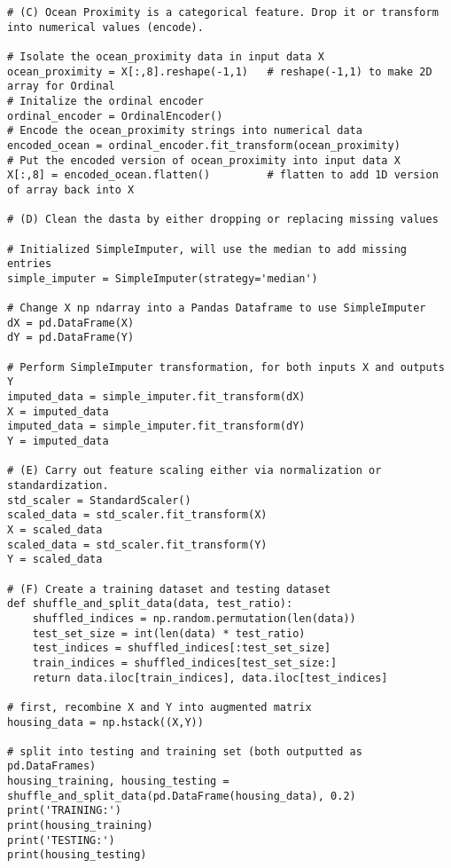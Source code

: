 \documentclass[11pt]{article}
\begin{document}
\begin{enumerate}[start=1,label={\bfseries Question \arabic*:},leftmargin=1in]
\begin{lstlisting}
# (C) Ocean Proximity is a categorical feature. Drop it or transform into numerical values (encode).

# Isolate the ocean_proximity data in input data X
ocean_proximity = X[:,8].reshape(-1,1)   # reshape(-1,1) to make 2D array for Ordinal
# Initalize the ordinal encoder
ordinal_encoder = OrdinalEncoder()
# Encode the ocean_proximity strings into numerical data
encoded_ocean = ordinal_encoder.fit_transform(ocean_proximity)
# Put the encoded version of ocean_proximity into input data X
X[:,8] = encoded_ocean.flatten()         # flatten to add 1D version of array back into X

# (D) Clean the dasta by either dropping or replacing missing values

# Initialized SimpleImputer, will use the median to add missing entries
simple_imputer = SimpleImputer(strategy='median')

# Change X np ndarray into a Pandas Dataframe to use SimpleImputer
dX = pd.DataFrame(X)
dY = pd.DataFrame(Y)

# Perform SimpleImputer transformation, for both inputs X and outputs Y
imputed_data = simple_imputer.fit_transform(dX)
X = imputed_data
imputed_data = simple_imputer.fit_transform(dY)
Y = imputed_data

# (E) Carry out feature scaling either via normalization or standardization.
std_scaler = StandardScaler()
scaled_data = std_scaler.fit_transform(X)
X = scaled_data
scaled_data = std_scaler.fit_transform(Y)
Y = scaled_data

# (F) Create a training dataset and testing dataset
def shuffle_and_split_data(data, test_ratio):
    shuffled_indices = np.random.permutation(len(data))
    test_set_size = int(len(data) * test_ratio)
    test_indices = shuffled_indices[:test_set_size]
    train_indices = shuffled_indices[test_set_size:]
    return data.iloc[train_indices], data.iloc[test_indices]

# first, recombine X and Y into augmented matrix
housing_data = np.hstack((X,Y))

# split into testing and training set (both outputted as pd.DataFrames)
housing_training, housing_testing = shuffle_and_split_data(pd.DataFrame(housing_data), 0.2)
print('TRAINING:')
print(housing_training)
print('TESTING:')
print(housing_testing)
        \end{lstlisting}

\end{enumerate}



\end{document}
